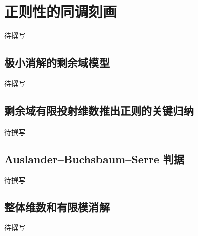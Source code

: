 
% 
% 

\section{正则性的同调刻画}
\label{g5:sec:0902}

待撰写

\subsection{极小消解的剩余域模型}
\label{g5:subsec:0902:01}
待撰写

\subsection{剩余域有限投射维数推出正则的关键归纳}
\label{g5:subsec:0902:02}
待撰写

\subsection{Auslander–Buchsbaum–Serre 判据}
\label{g5:subsec:0902:03}
待撰写

\subsection{整体维数和有限模消解}
\label{g5:subsec:0902:04}
待撰写
